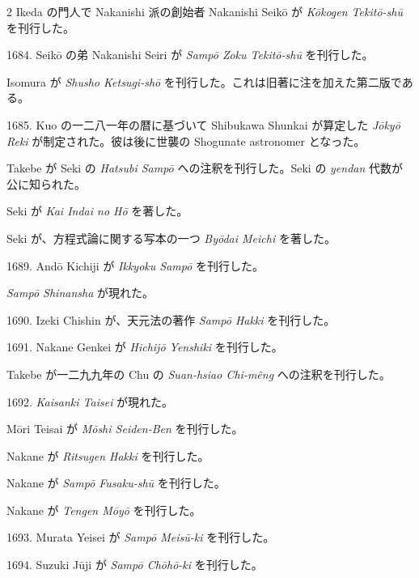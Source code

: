 \documentclass[11pt]{article}
\newcommand{\scanfooter}{}
\begin{document}
\begin{multicols}{2}
Ikeda の門人で Nakanishi 派の創始者 Nakanishi Seikō が \emph{Kōkogen Tekitō-shū} を刊行した。

1684. Seikō の弟 Nakanishi Seiri が \emph{Sampō Zoku Tekitō-shū} を刊行した。

Isomura が \emph{Shusho Ketsugi-shō} を刊行した。これは旧著に注を加えた第二版である。

1685. Kuo の一二八一年の暦に基づいて Shibukawa Shunkai が算定した \emph{Jōkyō Reki} が制定された。彼は後に世襲の Shogunate astronomer となった。

Takebe が Seki の \emph{Hatsubi Sampō} への注釈を刊行した。Seki の \emph{yendan} 代数が公に知られた。

Seki が \emph{Kai Indai no Hō} を著した。

Seki が、方程式論に関する写本の一つ \emph{Byōdai Meichi} を著した。

1689. Andō Kichiji が \emph{Ikkyoku Sampō} を刊行した。

\emph{Sampō Shinansha} が現れた。

1690. Izeki Chishin が、天元法の著作 \emph{Sampō Hakki} を刊行した。

1691. Nakane Genkei が \emph{Hichijō Yenshiki} を刊行した。

Takebe が一二九九年の Chu の \emph{Suan-hsiao Chi-mêng} への注釈を刊行した。

1692. \emph{Kaisanki Taisei} が現れた。

Mōri Teisai が \emph{Mōshi Seiden-Ben} を刊行した。

Nakane が \emph{Ritsugen Hakki} を刊行した。

Nakane が \emph{Sampō Fusaku-shū} を刊行した。

Nakane が \emph{Tengen Mōyō} を刊行した。

1693. Murata Yeisei が \emph{Sampō Meisū-ki} を刊行した。

1694. Suzuki Jūji が \emph{Sampō Chōhō-ki} を刊行した。
\end{multicols}
\scanfooter
\end{document}
